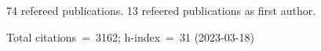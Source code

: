 74 refereed publications. 13 refeered publications as first author.

Total citations~=~3162; h-index~=~31 (2023-03-18)